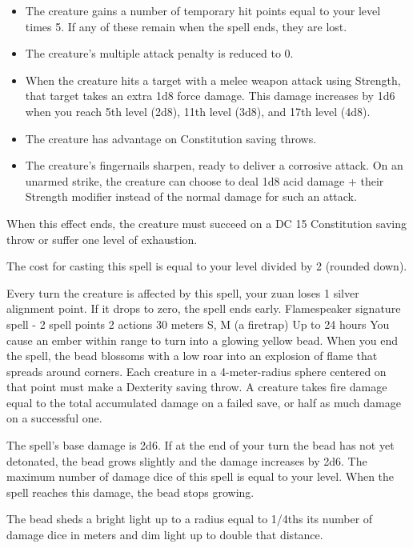     \begin{itemize}
        \item The creature gains a number of temporary hit points equal to your level times 5.
        If any of these remain when the spell ends, they are lost.
        \item The creature's multiple attack penalty is reduced to 0.
        \item When the creature hits a target with a melee weapon attack using Strength, that target takes an extra 1d8 force damage.
        This damage increases by 1d6 when you reach 5th level (2d8), 11th level (3d8), and 17th level (4d8).
        \item The creature has advantage on Constitution saving throws.
        \item The creature's fingernails sharpen, ready to deliver a corrosive attack.
        On an unarmed strike, the creature can choose to deal 1d8 acid damage + their Strength modifier instead of the normal damage for such an attack.
    \end{itemize}

    When this effect ends, the creature must succeed on a DC 15 Constitution saving throw or suffer one level of exhaustion.

    The cost for casting this spell is equal to your level divided by 2 (rounded down).

    Every turn the creature is affected by this spell, your zuan loses 1 silver alignment point.
    If it drops to zero, the spell ends early.
    {Flamespeaker signature spell - 2 spell points}
    {2 actions}
    {30 meters}
    {S, M (a firetrap)}
    {Up to 24 hours}
    You cause an ember within range to turn into a glowing yellow bead.
    When you end the spell, the bead blossoms with a low roar into an explosion of flame that spreads around corners.
    Each creature in a 4-meter-radius sphere centered on that point must make a Dexterity saving throw.
    A creature takes fire damage equal to the total accumulated damage on a failed save, or half as much damage on a successful one.

    The spell's base damage is 2d6.
    If at the end of your turn the bead has not yet detonated, the bead grows slightly and the damage increases by 2d6.
    The maximum number of damage dice of this spell is equal to your level.
    When the spell reaches this damage, the bead stops growing.

    The bead sheds a bright light up to a radius equal to 1/4ths its number of damage dice in meters and dim light up to double that distance.

